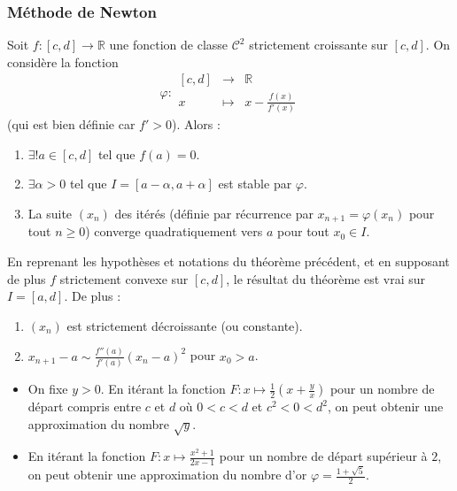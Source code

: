   \subsubsection{Méthode de Newton}


  \begin{theorem}
    Soit $f : [c, d] \rightarrow \mathbb{R}$ une fonction de classe $\mathcal{C}^2$ strictement croissante sur $[c, d]$. On considère la fonction
    \[ \varphi :
    \begin{array}{ccc}
      [c, d] &\rightarrow& \mathbb{R} \\
      x &\mapsto& x - \frac{f(x)}{f'(x)}
    \end{array}
    \]
    (qui est bien définie car $f' > 0$). Alors :
    \begin{enumerate}[label=(\roman*)]
      \item $\exists! a \in [c, d]$ tel que $f(a) = 0$.
      \item $\exists \alpha > 0$ tel que $I = [a - \alpha, a + \alpha]$ est stable par $\varphi$.
      \item La suite $(x_n)$ des itérés (définie par récurrence par $x_{n+1} = \varphi(x_n)$ pour tout $n \geq 0$) converge quadratiquement vers $a$ pour tout $x_0 \in I$.
    \end{enumerate}
  \end{theorem}

  \begin{corollary}
    En reprenant les hypothèses et notations du théorème précédent, et en supposant de plus $f$ strictement convexe sur $[c, d]$, le résultat du théorème est vrai sur $I = [a, d]$. De plus :
    \begin{enumerate}[label=(\roman*)]
      \item $(x_n)$ est strictement décroissante (ou constante).
      \item $x_{n+1} - a \sim \frac{f''(a)}{f'(a)} (x_n - a)^2$ pour $x_0 > a$.
    \end{enumerate}
  \end{corollary}

  \begin{example}
    \begin{itemize}
      \item On fixe $y > 0$. En itérant la fonction $F : x \mapsto \frac{1}{2} \left( x + \frac{y}{x} \right)$ pour un nombre de départ compris entre $c$ et $d$ où $0 < c < d$ et $c^2 < 0 < d^2$, on peut obtenir une approximation du nombre $\sqrt{y}$.
      \item En itérant la fonction $F : x \mapsto \frac{x^2+1}{2x-1}$ pour un nombre de départ supérieur à $2$, on peut obtenir une approximation du nombre d'or $\varphi = \frac{1+\sqrt{5}}{2}$.
    \end{itemize}
  \end{example}

